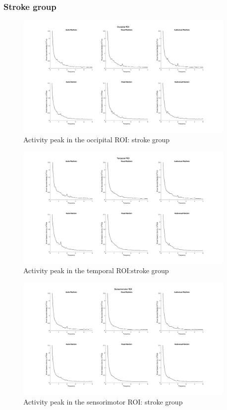 \subsubsection*{Stroke group}
\begin{figure}[H]
    \centering
    \includegraphics[width=0.95\textwidth]{stroke_images/occipital_roi.png}
    \caption{Activity peak in the occipital ROI: stroke group}
    \label{fig: occipital ROI: stroke}
\end{figure}
\begin{figure}[H]
    \centering
    \includegraphics[width=0.95\textwidth]{stroke_images/temporal_roi.png}
    \caption{Activity peak in the temporal ROI:stroke group}
    \label{fig: temporal ROI: stroke}
\end{figure}
\begin{figure}[H]
    \centering
    \includegraphics[width=0.95\textwidth]{stroke_images/sensorimotor_roi.png}
    \caption{Activity peak in the sensorimotor ROI: stroke group}
    \label{fig: sensorimotor ROI: stroke} 
\end{figure} 
\vfill

